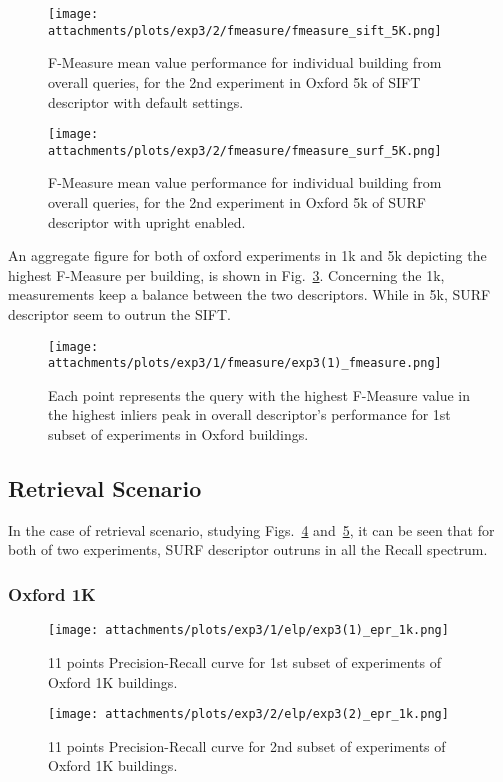 		\begin{figure}[H]
		    \centering
		    \texttt{[image: attachments/plots/exp3/2/fmeasure/fmeasure\_sift\_5K.png]}
		    \caption{F-Measure mean value performance for individual building from overall queries, for the 2nd experiment in Oxford 5k of SIFT descriptor with default settings.}
		    \label{fig:oxf_exp2_fmeasure_sift_5k}
		\end{figure}		

		\begin{figure}[H]
		    \centering
		    \texttt{[image: attachments/plots/exp3/2/fmeasure/fmeasure\_surf\_5K.png]}
		    \caption{F-Measure mean value performance for individual building from overall queries, for the 2nd experiment in Oxford 5k of SURF descriptor with upright enabled.}
		    \label{fig:oxf_exp2_fmeasure_surf_5k}
		\end{figure}
		
		An aggregate figure for both of oxford experiments in 1k and 5k depicting the highest F-Measure per building, is shown in Fig.~\ref{fig:oxf_exp1_fmeasure}.
		Concerning the 1k, measurements keep a balance between the two descriptors.
		While in 5k, SURF descriptor seem to outrun the SIFT.
		\begin{figure}[H]
		    \centering
		    \texttt{[image: attachments/plots/exp3/1/fmeasure/exp3(1)\_fmeasure.png]}
		    \caption{Each point represents the query with the highest F-Measure value in the highest inliers peak in overall descriptor's performance for 1st subset of experiments in Oxford buildings.}
		    \label{fig:oxf_exp1_fmeasure}
		\end{figure}			
      \newpage
      \subsection{Retrieval Scenario}\label{retrieval_scenario_ox} %
      
	In the case of retrieval scenario, studying Figs.~\ref{fig:oxf_exp1_epr_1k} and~\ref{fig:oxf_exp2_epr_1k}, it can be seen that for both of two experiments, SURF descriptor
	outruns in all the Recall spectrum.
	\subsubsection{Oxford 1K}\label{ret_ox_1k}
	
		\begin{figure}[ht!]
		    \centering
		    \texttt{[image: attachments/plots/exp3/1/elp/exp3(1)\_epr\_1k.png]}
		    \caption{11 points Precision-Recall curve for 1st subset of experiments of Oxford 1K buildings.}
		    \label{fig:oxf_exp1_epr_1k}
		\end{figure}
		\newpage
		\begin{figure}[ht!]
		    \centering
		    \texttt{[image: attachments/plots/exp3/2/elp/exp3(2)\_epr\_1k.png]}
		    \caption{11 points Precision-Recall curve for 2nd subset of experiments of Oxford 1K buildings.}
		    \label{fig:oxf_exp2_epr_1k}
		\end{figure}
		
